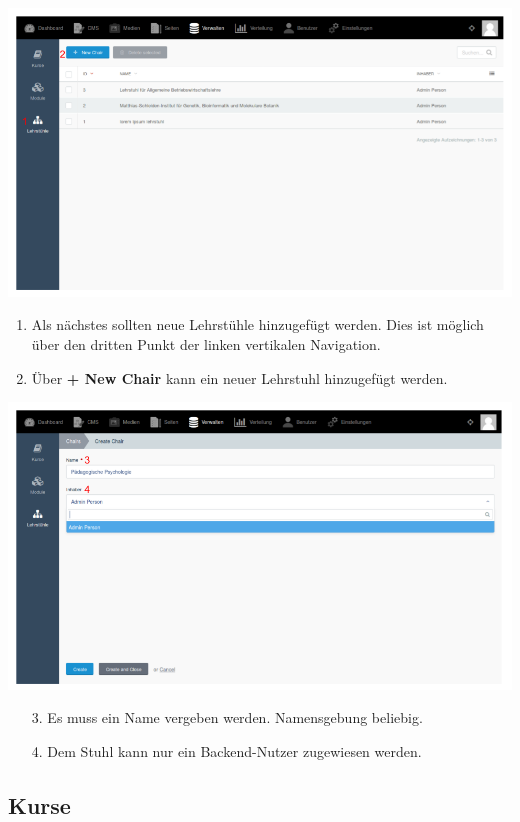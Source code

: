     \includegraphics[scale=0.3]{backend/img/chairs_1.png}
    \begin{enumerate}
      \item Als nächstes sollten neue Lehrstühle hinzugefügt werden. Dies ist möglich über den dritten Punkt der linken vertikalen Navigation.
     \item Über \textbf{+ New Chair} kann ein neuer Lehrstuhl hinzugefügt werden. 
    \end{enumerate}

    \includegraphics[scale=0.3]{backend/img/chairs_2.png}
    
    \begin{enumerate}
     \item[3.] Es muss ein Name vergeben werden. Namensgebung beliebig.
     \item[4.] Dem Stuhl kann nur ein Backend-Nutzer zugewiesen werden.
    \end{enumerate}

    \subsection{Kurse}
    
